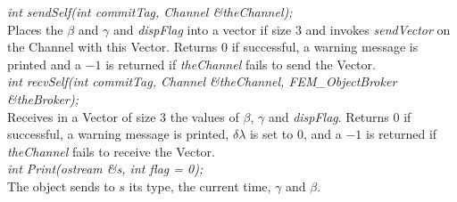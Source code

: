 {\em int sendSelf(int commitTag, Channel \&theChannel); } \\ 
Places the $\beta$ and $\gamma$ and {\em dispFlag} into a vector if size 3
and invokes {\em sendVector} on the Channel with this Vector. Returns
$0$ if successful, a warning message is printed and a $-1$ is
returned if {\em theChannel} fails to send the Vector. \\ 

{\em int recvSelf(int commitTag, Channel \&theChannel, 
FEM\_ObjectBroker \&theBroker); } \\ 
Receives in a Vector of size 3 the values of $\beta$, $\gamma$ and
{\em dispFlag}. Returns $0$ if successful, a warning message is printed,
$\delta \lambda$ is set to $0$, and a $-1$ is returned if {\em
theChannel} fails to receive the Vector.\\

{\em int Print(ostream \&s, int flag = 0);}\\
The object sends to $s$ its type, the current time, $\gamma$ and
$\beta$. 






